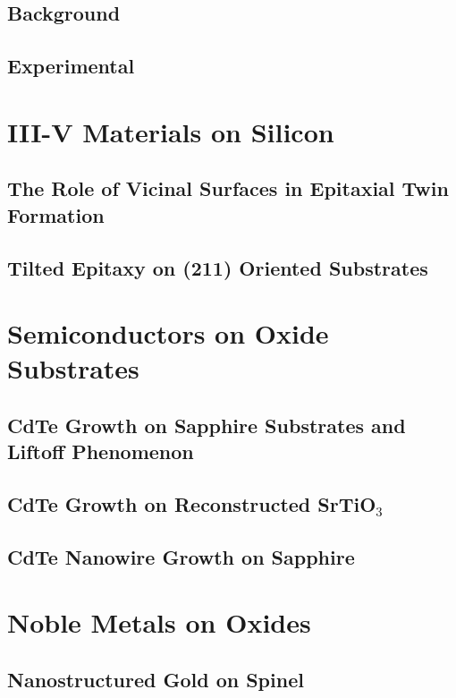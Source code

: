 \documentclass[letterpaper,12pt,twoside]{report}
\begin{document}
\chapter{Background}


\chapter{Experimental}


\part{III-V Materials on Silicon}
\chapter{The Role of Vicinal Surfaces in Epitaxial Twin Formation}


\chapter{Tilted Epitaxy on (211) Oriented Substrates}


\part{Semiconductors on Oxide Substrates}
\chapter{CdTe Growth on Sapphire Substrates and Liftoff Phenomenon}


\chapter{CdTe Growth on Reconstructed \texorpdfstring{SrTiO\(_3\)}{SrTiO3}}


\chapter{CdTe Nanowire Growth on Sapphire}


\part{Noble Metals on Oxides}
\chapter{Nanostructured Gold on Spinel}

\end{document}

